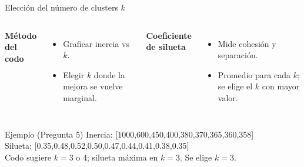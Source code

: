 \documentclass[aspectratio=169, 10pt, xcolor=table]{beamer}
\begin{document}
\begin{frame}{Elección del número de clusters $k$}
    \begin{columns}[t]
        \textbf{Método del codo}
        \begin{itemize}
            \item Graficar inercia vs $k$.
            \item Elegir $k$ donde la mejora se vuelve marginal.
        \end{itemize}
        \textbf{Coeficiente de silueta}
        \begin{itemize}
            \item Mide cohesión y separación.
            \item Promedio para cada $k$; se elige el $k$ con mayor valor.
        \end{itemize}
    \end{columns}
    \vspace{0.3cm}
    \begin{exampleblock}{Ejemplo (Pregunta 5)}
        Inercia: [1000,600,450,400,380,370,365,360,358] \\
        Silueta: [0.35,0.48,0.52,0.50,0.47,0.44,0.41,0.38,0.35] \\
        Codo sugiere $k=3$ o $4$; silueta máxima en $k=3$. Se elige $k=3$.
    \end{exampleblock}
\end{frame}

\end{document}
